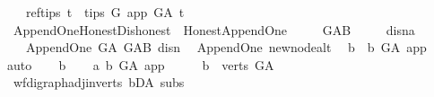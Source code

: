 \begin{isabellebody}
\ \ \ ref{\isacharunderscore}{\kern0pt}tips{\isacharcolon}{\kern0pt}\ {\isachardoublequoteopen}{\isasymforall}t\ {\isasymin}\ tips\ G{\isachardot}{\kern0pt}\ app\ {\isasymrightarrow}\isactrlbsub G{\isacharunderscore}{\kern0pt}A\isactrlesub \ t{\isachardoublequoteclose}\ \ \isanewline
\isanewline
\isanewline
{}\isamarkupfalse%
\ Append{\isacharunderscore}{\kern0pt}One{\isacharunderscore}{\kern0pt}Honest{\isacharunderscore}{\kern0pt}Dishonest\ {\isacharequal}{\kern0pt}\ Honest{\isacharunderscore}{\kern0pt}Append{\isacharunderscore}{\kern0pt}One\ {\isacharplus}{\kern0pt}\ \isanewline
\ \ \ G{\isacharunderscore}{\kern0pt}AB\ \ {\isacharparenleft}{\kern0pt}\isanewline
\ \ \ dis{\isacharunderscore}{\kern0pt}n{\isacharcolon}{\kern0pt}{\isacharcolon}{\kern0pt}{\isacharprime}{\kern0pt}a\isanewline
\ \ \ {\isachardoublequoteopen}Append{\isacharunderscore}{\kern0pt}One\ G{\isacharunderscore}{\kern0pt}A\ G{\isacharunderscore}{\kern0pt}AB\ dis{\isacharunderscore}{\kern0pt}n{\isachardoublequoteclose}%
\isadelimdocument
%
\endisadelimdocument
%
\isatagdocument
%
\isamarkuptrue%
%
\endisatagdocument
{\isafolddocument}%
%
\isadelimdocument
%
\endisadelimdocument
{}\isamarkupfalse%
\ {\isacharparenleft}{\kern0pt}\ Append{\isacharunderscore}{\kern0pt}One{\isacharparenright}{\kern0pt}\ new{\isacharunderscore}{\kern0pt}node{\isacharunderscore}{\kern0pt}alt{\isacharcolon}{\kern0pt}\isanewline
\ \ {\isachardoublequoteopen}{\isacharparenleft}{\kern0pt}{\isasymforall}b{\isachardot}{\kern0pt}\ {\isasymnot}\ b\ {\isasymrightarrow}\isactrlbsub G{\isacharunderscore}{\kern0pt}A\isactrlesub \ app{\isacharparenright}{\kern0pt}{\isachardoublequoteclose}\ \isanewline
%
\isadelimproof
%
\endisadelimproof
%
\isatagproof
{}\isamarkupfalse%
{\isacharparenleft}{\kern0pt}auto{\isacharparenright}{\kern0pt}\isanewline
\ \ \isamarkupfalse%
\ b\isanewline
\ \ \isamarkupfalse%
\ a{}{\isacharcolon}{\kern0pt}\ {\isachardoublequoteopen}b\ {\isasymrightarrow}\isactrlbsub G{\isacharunderscore}{\kern0pt}A\isactrlesub \ app{\isachardoublequoteclose}\isanewline
\ \ \isamarkupfalse%
\ \isamarkupfalse%
\ {\isachardoublequoteopen}b\ {\isasymin}\ verts\ G{\isacharunderscore}{\kern0pt}A{\isachardoublequoteclose}\ \isamarkupfalse%
\ wf{\isacharunderscore}{\kern0pt}digraph{\isachardot}{\kern0pt}adj{\isacharunderscore}{\kern0pt}in{\isacharunderscore}{\kern0pt}verts{\isacharparenleft}{\kern0pt}{}{\isacharparenright}{\kern0pt}\ bD{\isacharunderscore}{\kern0pt}A\ subs\ \isamarkupfalse%

\end{isabellebody}

